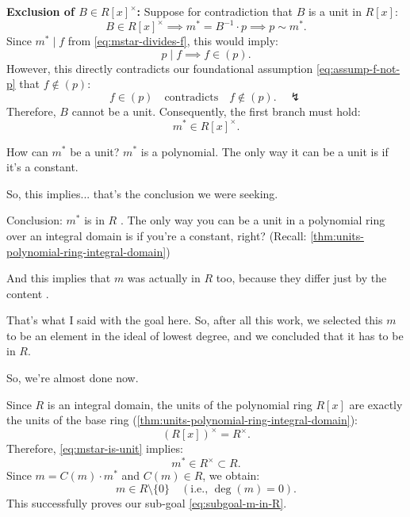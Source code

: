 \begin{proofWrapper}
\begin{content}
\textbf{Exclusion of $B \in R[x]^\times$:}
Suppose for contradiction that $B$ is a unit in $R[x]$:
\[
B \in R[x]^\times \implies m^* = B^{-1} \cdot p \implies p \sim m^*.
\]
Since $m^* \mid f$ from \eqref{eq:mstar-divides-f}, this would imply:
\[
p \mid f \implies f \in (p).
\]
However, this directly contradicts our foundational assumption \eqref{eq:assump-f-not-p} that $f \notin (p)$:
\[
f \in (p) \quad \text{contradicts} \quad f \notin (p). \quad \lightning
\]
Therefore, $B$ cannot be a unit. Consequently, the first branch must hold:
\begin{equation}\label{eq:mstar-is-unit}
m^* \in R[x]^\times.
\end{equation}
\end{content}

\begin{speech}[00:33:44 - 00:34:34]
How can $m^*$ be a unit? $m^*$ is a polynomial. The only way it can be a unit is if it's a constant.

So, this implies... that's the conclusion we were seeking.

Conclusion: $m^*$ is in $R$ . The only way you can be a unit in a polynomial ring over an integral domain is if you're a constant, right? (Recall: \cref{thm:units-polynomial-ring-integral-domain})

And this implies that $m$ was actually in $R$ too, because they differ just by the content .

That's what I said with the goal here. So, after all this work, we selected this $m$ to be an element in the ideal of lowest degree, and we concluded that it has to be in $R$.

So, we're almost done now.
\end{speech}

\begin{content}
Since $R$ is an integral domain, the units of the polynomial ring $R[x]$ are exactly the units of the base ring (\cref{thm:units-polynomial-ring-integral-domain}):
\[
(R[x])^\times = R^\times.
\]
Therefore, \eqref{eq:mstar-is-unit} implies:
\[
m^* \in R^\times \subset R.
\]
Since $m = C(m) \cdot m^*$ and $C(m) \in R$, we obtain:
\begin{equation}\label{eq:m-in-R-established}
\boxed{m \in R \setminus \{0\}} \quad (\text{i.e., } \deg(m) = 0).
\end{equation}
This successfully proves our sub-goal \eqref{eq:subgoal-m-in-R}.
\end{content}


\end{proofWrapper}
